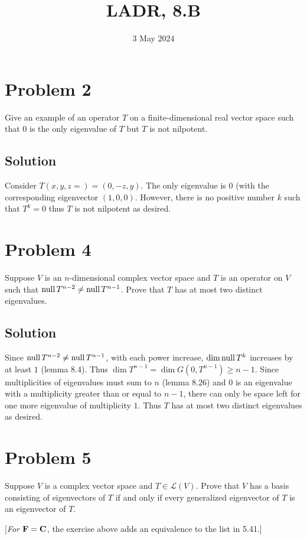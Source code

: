 \documentclass{article}
\title{LADR, 8.B}
\date{3 May 2024}
\begin{document}
\maketitle

\section*{Problem 2}
Give an example of an operator $T$ on a finite-dimensional real vector space such that $0$ is the only eigenvalue of $T$ but $T$ is not nilpotent.

\subsection*{Solution}
Consider $T(x, y, z=)=(0,-z,y)$. The only eigenvalue is $0$ (with the corresponding eigenvector $(1,0,0)$. However, there is no positive number $k$ such that $T^k=0$ thus $T$ is not nilpotent as desired.

\section*{Problem 4}
Suppose $V$ is an $n$-dimensional complex vector space and $T$ is an operator on $V$ such that $\text{null}\, T^{n-2}\neq \text{null}\, T^{n-1}$. Prove that $T$ has at most two distinct eigenvalues.

\subsection*{Solution}
Since $\text{null}\, T^{n-2}\neq \text{null}\, T^{n-1}$, with each power increase, $\dim\text{null}\, T^k$ increases by at least $1$ (lemma 8.4). Thus $\dim T^{n-1}=\dim G(0, T^{n-1})\geq n-1$. Since multiplicities of eigenvalues must sum to $n$ (lemma 8.26) and $0$ is an eigenvalue with a multiplicity greater than or equal to $n-1$, there can only be space left for one more eigenvalue of multiplicity $1$. Thus $T$ has at most two distinct eigenvalues as desired.

\section*{Problem 5}
Suppose $V$ is a complex vector space and $T\in\mathcal{L}(V)$. Prove that $V$ has a basis consisting of eigenvectors of $T$ if and only if every generalized eigenvector of $T$ is an eigenvector of $T$.

[\textit{For $\mathbf{F}=\mathbf{C}$}, the exercise above adds an equivalence to the list in 5.41.]
\end{document}

